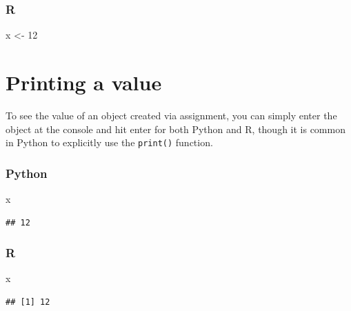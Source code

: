 \documentclass[
]{book}
\newenvironment{Shaded}{\begin{snugshade}}{\end{snugshade}}
\newcommand{\DecValTok}[1]{\textcolor[rgb]{0.00,0.00,0.81}{#1}}
\newcommand{\NormalTok}[1]{#1}
\newcommand{\OtherTok}[1]{\textcolor[rgb]{0.56,0.35,0.01}{#1}}
\begin{document}
\hypertarget{r-1}{%
\subsubsection*{R}\label{r-1}}

\begin{Shaded}
\begin{Highlighting}[]
\NormalTok{x }\OtherTok{\textless{}{-}} \DecValTok{12}
\end{Highlighting}
\end{Shaded}

\hypertarget{printing-a-value}{%
\section{Printing a value}\label{printing-a-value}}

To see the value of an object created via assignment, you can simply enter the object at the console and hit enter for both Python and R, though it is common in Python to explicitly use the \texttt{print()} function.

\hypertarget{python-2}{%
\subsubsection*{Python}\label{python-2}}

\begin{Shaded}
\begin{Highlighting}[]
\NormalTok{x}
\end{Highlighting}
\end{Shaded}

\begin{verbatim}
## 12
\end{verbatim}

\hypertarget{r-2}{%
\subsubsection*{R}\label{r-2}}

\begin{Shaded}
\begin{Highlighting}[]
\NormalTok{x}
\end{Highlighting}
\end{Shaded}

\begin{verbatim}
## [1] 12
\end{verbatim}
\end{document}
